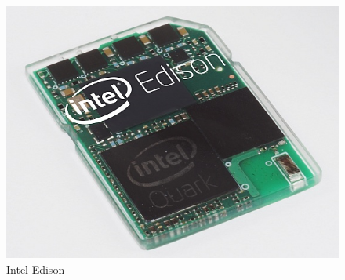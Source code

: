 \begin{figure}[H]
\includegraphics{images/intel-edison-560}
\protect\caption{Intel Edison}
\end{figure}


